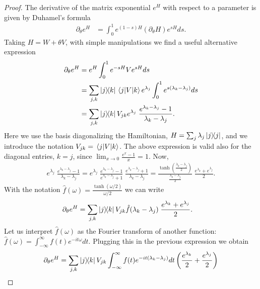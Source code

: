 \documentclass[
    aps,
    prx,
    onecolumn
]{revtex4-2}
\begin{document}
\begin{proof}
The derivative of the matrix exponential $e^H$ with respect to a parameter is given by Duhamel's formula~\cite{Haber_2018}
\begin{align}
\label{eq:duhamel}
    \partial_\theta e^H &= \int_0^1 e^{(1-s)H} (\partial_\theta H) e^{s H} ds .
\end{align}
Taking $H=W+\theta V$, with simple manipulations we find a useful alternative expression
\begin{align}
\label{eq:manip1}
\begin{split}
    \partial_\theta e^H &= e^H \int_0^1 e^{-sH} V e^{s H} ds \\
    &= \sum_{j,k} \ketbra{j}{k} \matrixel{j}{V}{k} e^{\lambda_j} \int_0^1 e^{s(\lambda_k - \lambda_j)} ds \\
    &= \sum_{j,k} \ketbra{j}{k} V_{jk} e^{\lambda_j} \; \frac{e^{\lambda_k - \lambda_j} - 1}{\lambda_k - \lambda_j} .
\end{split}
\end{align}
Here we use the basis diagonalizing the Hamiltonian, $H = \sum_{j} \lambda_j \dyad{j}$, and we introduce the notation $V_{jk} = \matrixel{j}{V}{k}$. The above expression is valid also for the diagonal entries, $k=j$, since $\lim_{x \rightarrow 0} \frac{e^x - 1}{x} = 1$.  Now,
\begin{align}
    e^{\lambda_j} \; \frac{e^{\lambda_k - \lambda_j} - 1}{\lambda_k - \lambda_j}  =  e^{\lambda_j} \; \frac{e^{\lambda_k - \lambda_j} - 1}{e^{\lambda_k - \lambda_j} +1 } \; \frac{e^{\lambda_k - \lambda_j} +1 }{\lambda_k - \lambda_j}  =  \frac{\tanh( \tfrac{\lambda_k - \lambda_j}{2})}{ \tfrac{\lambda_k - \lambda_j}{2} } \; \frac{e^{\lambda_k} + e^{\lambda_j} }{2} .
\end{align}
With the notation $\hat{f}(\omega) = \frac{\tanh(\omega/2)}{\omega/2}$ we can write
\begin{align}
    \partial_\theta e^H &= \sum_{j,k} \ketbra{j}{k} V_{jk} \hat{f}(\lambda_k - \lambda_j) \; \frac{e^{\lambda_k} + e^{\lambda_j} }{2} .
\end{align}
Let us interpret $\hat{f}(\omega)$ as the Fourier transform of another function: $\hat{f}(\omega) = \int_{-\infty}^\infty f(t) e^{-i t \omega} dt$. Plugging this in the previous expression we obtain
\begin{align}
\begin{split}
\label{eq:ExpDerCommutator} 
    \partial_\theta e^H &= \sum_{j,k} \ketbra{j}{k} V_{jk} \int_{-\infty}^{\infty} f(t) e^{-it(\lambda_k - \lambda_j)} dt \left( \frac{e^{\lambda_k}}{2} + \frac{e^{\lambda_j}}{2} \right) \\

\end{split}
\end{align}
\end{proof}
\end{document}
